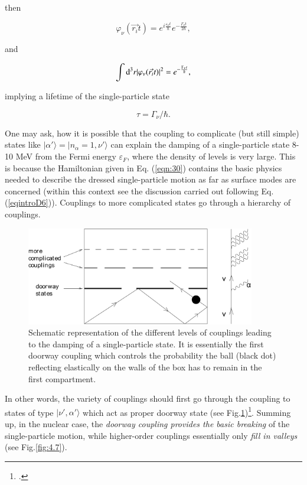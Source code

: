\noindent then

\begin{equation}
\nonumber
\varphi_{\nu}(\vec{r_i} t) = e^{i \frac{\varepsilon_{\nu} t}{\hbar}} e^{- \frac{\Gamma_{\nu} t}{2\hbar}} ,
\end{equation}

\noindent and

\begin{equation}
\int{\rm d}^3 r |\varphi_{\nu} (\vec{r_i} t)|^2 = e^{- \frac{\Gamma_{\nu} t}{\hbar}} ,
\label{eqn:44b}
\end{equation}

\noindent implying a lifetime of the single-particle state

\begin{equation}
\tau = \Gamma_\nu/\hbar .
\label{eqn:45}
\end{equation}

One may ask, how it is possible that the coupling to complicate (but still simple) states like $|\alpha'\rangle = |n_\alpha = 1,\nu'\rangle$ can explain the  damping of a single-particle state 8-10 MeV from the Fermi energy $\varepsilon_F$, where the density of levels  is very large. This is because the Hamiltonian given in Eq. (\ref{eqn:30}) contains  the basic physics needed to describe the dressed single-particle motion as far as surface modes are concerned (within this context see the discussion carried out following Eq. (\ref{eqintroD6})). Couplings to more complicated states  go through a hierarchy of couplings.
\begin{figure}[h!]
\centerline {
\includegraphics*[width=10cm]{introduccion/figs/figintroD6}
}
\caption{Schematic representation of the different levels of couplings leading to the damping of a single-particle state. It is essentially the first doorway coupling which controls the probability the ball (black dot) reflecting elastically on the walls of the box has to remain in the first compartment.}
\label{fig:4.6}
\end{figure}
In other words, the variety of couplings  should first go  through the coupling to states of type $|\nu',\alpha'\rangle$ which act as proper doorway state (see Fig.\ref{fig:4.6})\footnote{\cite{Feshbach:58}.}. Summing up, in  the nuclear case, the {\it doorway coupling provides the basic breaking} of the single-particle motion, while higher-order couplings essentially only {\it fill in valleys} (see Fig.\ref{fig:4.7}).

